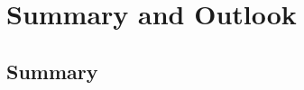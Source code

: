 \chapter{Summary and Outlook}
\label{conclusion_chapter}

\section{Summary}
\label{Conclusion_Summary}
